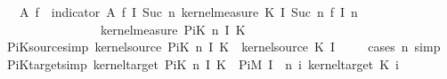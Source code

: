 \begin{isabellebody}
{\ \ {\isacharparenleft}{\kern0pt}{\isasymlambda}{\isasymomega}\ A{\isacharprime}{\kern0pt}{\isachardot}{\kern0pt}\ {\isasymintegral}\isactrlsup {\isacharplus}{\kern0pt}{\isasymomega}\isactrlsub f{\isachardot}{\kern0pt}\ {\isacharparenleft}{\kern0pt}{\isasymintegral}\isactrlsup {\isacharplus}{\kern0pt}{\isasymomega}{\isachardot}{\kern0pt}\ indicator\ A{\isacharprime}{\kern0pt}\ {\isacharparenleft}{\kern0pt}{\isasymomega}\isactrlsub f\ {\isacharparenleft}{\kern0pt}I\ {\isacharparenleft}{\kern0pt}Suc\ n{\isacharparenright}{\kern0pt}{\isacharcolon}{\kern0pt}{\isacharequal}{\kern0pt}{\isasymomega}{\isacharparenright}{\kern0pt}{\isacharparenright}{\kern0pt}\ {\isasympartial}kernel{\isacharunderscore}{\kern0pt}measure\ {\isacharparenleft}{\kern0pt}K\ {\isacharparenleft}{\kern0pt}I\ {\isacharparenleft}{\kern0pt}Suc\ n{\isacharparenright}{\kern0pt}{\isacharparenright}{\kern0pt}{\isacharparenright}{\kern0pt}\ {\isacharparenleft}{\kern0pt}{\isasymomega}\isactrlsub f\ {\isacharparenleft}{\kern0pt}I\ n{\isacharparenright}{\kern0pt}{\isacharparenright}{\kern0pt}{\isacharparenright}{\kern0pt}\isanewline
\ \ \ \ \ \ \ \ \ \ \ \ \ \ \ \ {\isasympartial}kernel{\isacharunderscore}{\kern0pt}measure\ {\isacharparenleft}{\kern0pt}PiK\ n\ I\ K{\isacharparenright}{\kern0pt}\ {\isasymomega}{\isacharparenright}{\kern0pt}{\isachardoublequoteclose}%
}%
\isamarkupfalse%
\ PiK{\isacharunderscore}{\kern0pt}source{\isacharbrackleft}{\kern0pt}simp{\isacharbrackright}{\kern0pt}{\isacharcolon}{\kern0pt}\ {\isachardoublequoteopen}kernel{\isacharunderscore}{\kern0pt}source\ {\isacharparenleft}{\kern0pt}PiK\ n\ I\ K{\isacharparenright}{\kern0pt}\ {\isacharequal}{\kern0pt}\ kernel{\isacharunderscore}{\kern0pt}source\ {\isacharparenleft}{\kern0pt}K\ {\isacharparenleft}{\kern0pt}I\ {}{\isacharparenright}{\kern0pt}{\isacharparenright}{\kern0pt}{\isachardoublequoteclose}\isanewline
%
\isadelimproof
\ \ %
\endisadelimproof
%
\isatagproof
{}\isamarkupfalse%
\ {\isacharparenleft}{\kern0pt}cases\ n{\isacharsemicolon}{\kern0pt}\ simp{\isacharparenright}{\kern0pt}%
\endisatagproof
{\isafoldproof}%
%
\isadelimproof
\isanewline
%
\endisadelimproof
\isanewline
{}\isamarkupfalse%
\ PiK{\isacharunderscore}{\kern0pt}target{\isacharbrackleft}{\kern0pt}simp{\isacharbrackright}{\kern0pt}{\isacharcolon}{\kern0pt}\ {\isachardoublequoteopen}kernel{\isacharunderscore}{\kern0pt}target\ {\isacharparenleft}{\kern0pt}PiK\ n\ I\ K{\isacharparenright}{\kern0pt}\ {\isacharequal}{\kern0pt}\ PiM\ {\isacharparenleft}{\kern0pt}I\ {\isacharbackquote}{\kern0pt}\ {\isacharbraceleft}{\kern0pt}{}{\isachardot}{\kern0pt}{\isachardot}{\kern0pt}n{\isacharbraceright}{\kern0pt}{\isacharparenright}{\kern0pt}\ {\isacharparenleft}{\kern0pt}{\isasymlambda}i{\isachardot}{\kern0pt}\ kernel{\isacharunderscore}{\kern0pt}target\ {\isacharparenleft}{\kern0pt}K\ i{\isacharparenright}{\kern0pt}{\isacharparenright}{\kern0pt}{\isachardoublequoteclose}\isanewline

\end{isabellebody}
